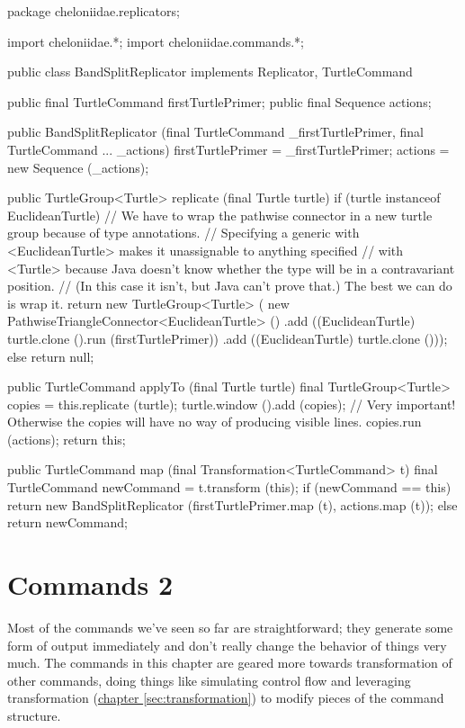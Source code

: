 \documentclass{report}
\newcommand{\Ref}[2]{\hyperref[#2]{#1 \ref*{#2}}}
\begin{document}
\begin{javacode}
package cheloniidae.replicators;

import cheloniidae.*;
import cheloniidae.commands.*;

public class BandSplitReplicator implements Replicator, TurtleCommand {
  public final TurtleCommand firstTurtlePrimer;
  public final Sequence      actions;

  public BandSplitReplicator (final TurtleCommand _firstTurtlePrimer, final TurtleCommand ... _actions)
    {firstTurtlePrimer = _firstTurtlePrimer; actions = new Sequence (_actions);}

  public TurtleGroup<Turtle> replicate (final Turtle turtle) {
    if (turtle instanceof EuclideanTurtle)
      // We have to wrap the pathwise connector in a new turtle group because of type annotations.
      // Specifying a generic with <EuclideanTurtle> makes it unassignable to anything specified
      // with <Turtle> because Java doesn't know whether the type will be in a contravariant position.
      // (In this case it isn't, but Java can't prove that.) The best we can do is wrap it.
      return new TurtleGroup<Turtle> (
               new PathwiseTriangleConnector<EuclideanTurtle> ()
                 .add ((EuclideanTurtle) turtle.clone ().run (firstTurtlePrimer))
                 .add ((EuclideanTurtle) turtle.clone ()));
    else return null;
  }

  public TurtleCommand applyTo (final Turtle turtle) {
    final TurtleGroup<Turtle> copies = this.replicate (turtle);
    turtle.window ().add (copies);      // Very important! Otherwise the copies will have no way of producing visible lines.
    copies.run (actions);
    return this;
  }

  public TurtleCommand map (final Transformation<TurtleCommand> t) {
    final TurtleCommand newCommand = t.transform (this);
    if (newCommand == this) return new BandSplitReplicator (firstTurtlePrimer.map (t), actions.map (t));
    else                    return newCommand;
  }
}
\end{javacode}

\chapter {Commands 2} \label{sec:commands-2}
    Most of the commands we've seen so far are straightforward; they generate some form of output immediately and don't really change the behavior of things
    very much. The commands in this chapter are geared more towards transformation of other commands, doing things like simulating control flow and leveraging
    transformation (\Ref{chapter}{sec:transformation}) to modify pieces of the command structure.
\end{document}
